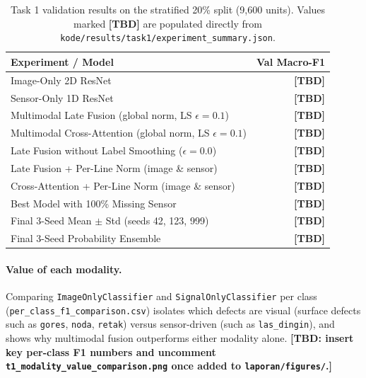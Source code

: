 \begin{table}[t]
  \centering
  \caption{Task 1 validation results on the stratified 20\% split (9{,}600 units). Values marked
  \textbf{[TBD]} are populated directly from \texttt{kode/results/task1/experiment\_summary.json}.}
  \label{tab:t1-results}
  \small
  \begin{tabular}{lr}
    \toprule
    Experiment / Model & Val Macro-F1 \\
    \midrule
    Image-Only 2D ResNet                                & \textbf{[TBD]} \\
    Sensor-Only 1D ResNet                               & \textbf{[TBD]} \\
    Multimodal Late Fusion (global norm, LS $\epsilon=0.1$) & \textbf{[TBD]} \\
    Multimodal Cross-Attention (global norm, LS $\epsilon=0.1$) & \textbf{[TBD]} \\
    Late Fusion without Label Smoothing ($\epsilon=0.0$) & \textbf{[TBD]} \\
    Late Fusion + Per-Line Norm (image \& sensor)       & \textbf{[TBD]} \\
    Cross-Attention + Per-Line Norm (image \& sensor)   & \textbf{[TBD]} \\
    Best Model with 100\% Missing Sensor                & \textbf{[TBD]} \\
    Final 3-Seed Mean $\pm$ Std (seeds 42, 123, 999)    & \textbf{[TBD]} \\
    Final 3-Seed Probability Ensemble                   & \textbf{[TBD]} \\
    \bottomrule
  \end{tabular}
\end{table}

\paragraph{Value of each modality.} Comparing \texttt{ImageOnlyClassifier} and
\texttt{SignalOnlyClassifier} per class (\texttt{per\_class\_f1\_comparison.csv}) isolates which
defects are visual (surface defects such as \texttt{gores}, \texttt{noda}, \texttt{retak}) versus
sensor-driven (such as \texttt{las\_dingin}), and shows why multimodal fusion outperforms either
modality alone. \textbf{[TBD: insert key per-class F1 numbers and uncomment
\texttt{t1\_modality\_value\_comparison.png} once added to \texttt{laporan/figures/}.]}



